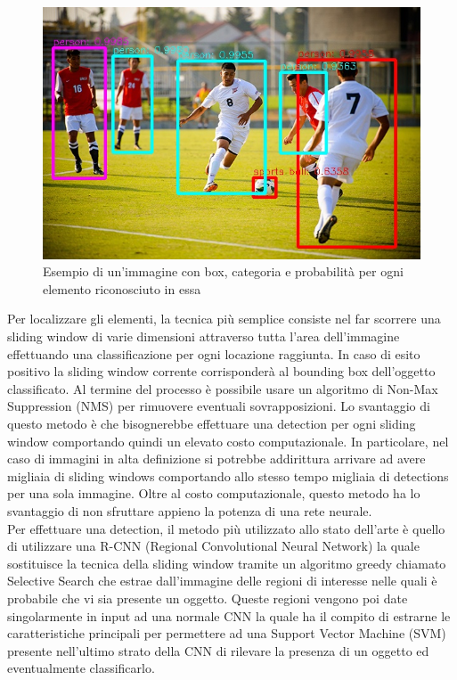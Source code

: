 \begin{figure}[H]
	\centering
	\includegraphics[width=0.7\linewidth]{images/esempio-detection.jpg}
	\caption{Esempio di un'immagine con box, categoria e probabilità per ogni elemento riconosciuto in essa}
	\label{Esempio di detection ideale}
\end{figure}
Per localizzare gli elementi, la tecnica più semplice consiste nel far scorrere una sliding window di varie dimensioni attraverso tutta l'area dell'immagine effettuando una classificazione per ogni locazione raggiunta. In caso di esito positivo la sliding window corrente corrisponderà al bounding box dell'oggetto classificato. Al termine del processo è possibile usare un algoritmo di Non-Max Suppression (NMS) per rimuovere eventuali sovrapposizioni. Lo svantaggio di questo metodo è che bisognerebbe effettuare una detection per ogni sliding window comportando quindi un elevato costo computazionale. In particolare, nel caso di immagini in alta definizione si potrebbe addirittura arrivare ad avere migliaia di sliding windows comportando allo stesso tempo migliaia di detections per una sola immagine. Oltre al costo computazionale, questo metodo ha lo svantaggio di non sfruttare appieno la potenza di una rete neurale.\\
Per effettuare una detection, il metodo più utilizzato allo stato dell'arte è quello di utilizzare una R-CNN (Regional Convolutional Neural Network)\cite{RCNN} la quale sostituisce la tecnica della sliding window tramite un algoritmo greedy chiamato Selective Search che estrae dall'immagine delle regioni di interesse nelle quali è probabile che vi sia presente un oggetto. Queste regioni vengono poi date singolarmente in input ad una normale CNN la quale ha il compito di estrarne le caratteristiche principali per permettere ad una Support Vector Machine (SVM) presente nell'ultimo strato della CNN di rilevare la presenza di un oggetto ed eventualmente classificarlo.\\
